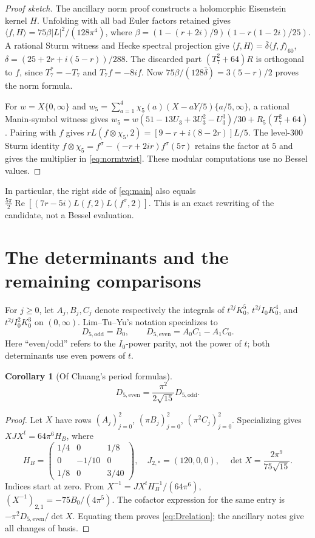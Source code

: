 \documentclass[11pt]{article}
\numberwithin{equation}{section}
\newtheorem{corollary}[theorem]{Corollary}
\theoremstyle{definition}
\theoremstyle{remark}
\theoremstyle{plain}
\newcommand{\Real}{\operatorname{Re}}
\newcommand{\De}{D_{5,\mathrm{even}}}
\newcommand{\Do}{D_{5,\mathrm{odd}}}
\begin{document}
\begin{proof}[Proof sketch]
The ancillary norm proof constructs a holomorphic Eisenstein kernel $H$.
Unfolding with all bad Euler factors retained gives
$\langle f,H\rangle=75\beta|L|^2/(128\pi^4)$,
where $\beta=(1-(r+2i)/9)(1-r(1-2i)/25)$.
A rational Sturm witness and Hecke spectral projection give
$\langle f,H\rangle=\bar\delta\langle f,f\rangle_{60}$,
$\delta=(25+2r+i(5-r))/288$.
The discarded part $(T_7^2+64)R$ is orthogonal to $f$, since
$T_7^*=-T_7$ and $T_7f=-8if$.
Now $75\beta/(128\bar\delta)=3(5-r)/2$ proves the norm formula.

For $w=X\{0,\infty\}$ and
$w_5=\sum_{a=1}^4\chi_5(a)(X-aY/5)\{a/5,\infty\}$, a rational Manin-symbol
witness gives $w_5=w(51-13U_3+3U_3^2-U_3^3)/30+R_5(T_7^2+64)$.
Pairing with $f$ gives $rL(f\otimes\chi_5,2)=[9-r+i(8-2r)]L/5$.
The level-$300$ Sturm identity
$f\otimes\chi_5=f^\sigma-(-r+2ir)f^\sigma(5\tau)$ retains the factor at $5$
and gives the multiplier in \eqref{eq:normtwist}.
These modular computations \cite{Stein} use no Bessel values.
\end{proof}

In particular, the right side of \eqref{eq:main} also equals
$\frac{5\pi}{2}\Real[(7r-5i)L(f,2)L(f^\sigma,2)]$.
This is an exact rewriting of the candidate, not a Bessel evaluation.

\section{The determinants and the remaining comparisons}
For $j\ge0$, let $A_j,B_j,C_j$ denote respectively the integrals of
$t^{2j}K_0^5$, $t^{2j}I_0K_0^4$, and $t^{2j}I_0^2K_0^3$ on $(0,\infty)$.
Lim--Tu--Yu's notation \cite[eq.~(42)]{LTY} specializes to
\begin{equation}\label{eq:Ddef}
 \Do=B_0,\qquad \De=A_0C_1-A_1C_0.
\end{equation}
Here ``even/odd'' refers to the $I_0$-power parity, not the power of $t$;
both determinants use even powers of $t$.
\begin{corollary}[Of Chuang's period formulas]\label{cor:det}
\begin{equation}\label{eq:Drelation}
 \De=\frac{\pi^2}{2\sqrt{15}}\Do.
\end{equation}
\end{corollary}
\begin{proof}
Let $X$ have rows $(A_j)_{j=0}^2$, $(\pi B_j)_{j=0}^2$,
$(\pi^2C_j)_{j=0}^2$.
Specializing \cite[Propositions~13, 18, 24, 32 and Corollary~39]{Chu}
gives $XJX^t=64\pi^6H_B$, where
\[
 H_B=\begin{pmatrix}1/4&0&1/8\\0&-1/10&0\\1/8&0&3/40\end{pmatrix},
 \quad J_{2,*}=(120,0,0),\quad
 \det X=\frac{2\pi^9}{75\sqrt{15}}.
\]
Indices start at zero. From $X^{-1}=JX^tH_B^{-1}/(64\pi^6)$,
$(X^{-1})_{2,1}=-75B_0/(4\pi^5)$.
The cofactor expression for the same entry is $-\pi^2\De/\det X$.
Equating them proves \eqref{eq:Drelation}; the ancillary notes give
all changes of basis.
\end{proof}
\end{document}
